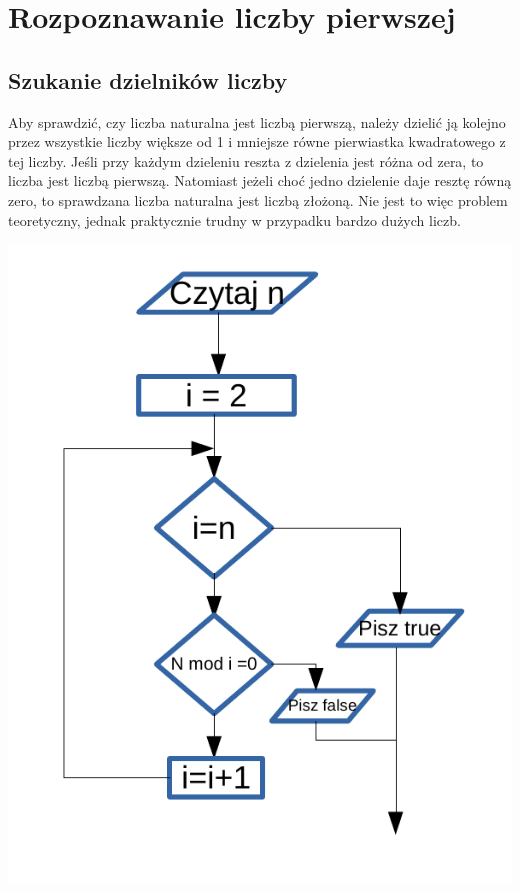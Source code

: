 \documentclass{article}
\begin{document}
\newpage

\section{Rozpoznawanie liczby pierwszej}

\subsection{Szukanie dzielników liczby}
Aby sprawdzić, czy liczba naturalna jest liczbą pierwszą, należy dzielić ją kolejno przez wszystkie liczby większe od 1 i mniejsze równe pierwiastka kwadratowego z tej liczby. Jeśli przy każdym dzieleniu reszta z dzielenia jest różna od zera, to liczba jest liczbą pierwszą. Natomiast jeżeli choć jedno dzielenie daje resztę równą zero, to sprawdzana liczba naturalna jest liczbą złożoną. Nie jest to więc problem teoretyczny, jednak praktycznie trudny w przypadku bardzo dużych liczb.

\begin{diagram}
\includegraphics{1.pdf}
\end{diagram}
\end{document}
